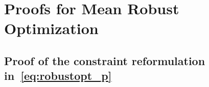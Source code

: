 \chapter{Proofs for Mean Robust Optimization}
\label{app:mro}

\section{Proof of the constraint reformulation in~\eqref{eq:robustopt_p}}

\label{app:dual_form}
